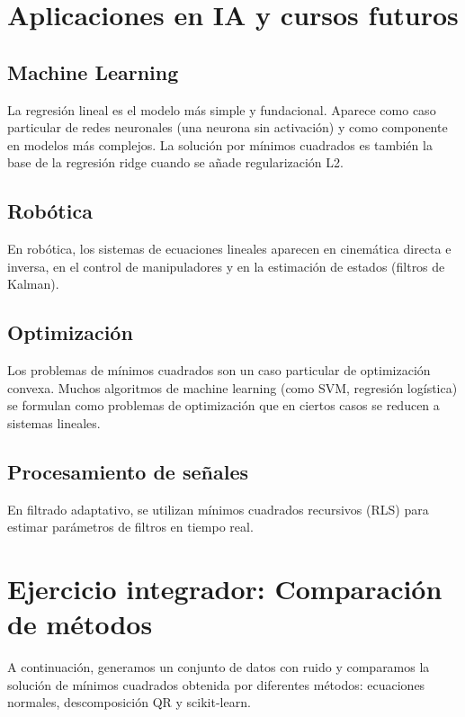 \documentclass[12pt,a4paper,openany,oneside]{book}
\begin{document}
\section{Aplicaciones en IA y cursos futuros}

\subsection{Machine Learning}
La regresión lineal es el modelo más simple y fundacional. Aparece como caso particular de redes neuronales (una neurona sin activación) y como componente en modelos más complejos. La solución por mínimos cuadrados es también la base de la regresión ridge cuando se añade regularización L2.

\subsection{Robótica}
En robótica, los sistemas de ecuaciones lineales aparecen en cinemática directa e inversa, en el control de manipuladores y en la estimación de estados (filtros de Kalman).

\subsection{Optimización}
Los problemas de mínimos cuadrados son un caso particular de optimización convexa. Muchos algoritmos de machine learning (como SVM, regresión logística) se formulan como problemas de optimización que en ciertos casos se reducen a sistemas lineales.

\subsection{Procesamiento de señales}
En filtrado adaptativo, se utilizan mínimos cuadrados recursivos (RLS) para estimar parámetros de filtros en tiempo real.

\section{Ejercicio integrador: Comparación de métodos}

A continuación, generamos un conjunto de datos con ruido y comparamos la solución de mínimos cuadrados obtenida por diferentes métodos: ecuaciones normales, descomposición QR y scikit-learn.
\end{document}

